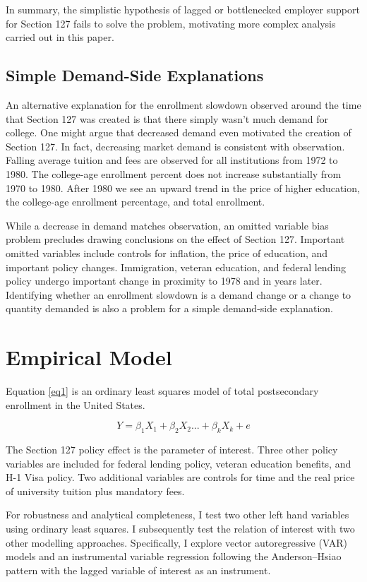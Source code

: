 \documentclass[review]{elsarticle}
\begin{document}
In summary, the simplistic hypothesis of lagged or bottlenecked employer support for Section 127 fails to solve the problem,
motivating more complex analysis carried out in this paper.

\subsection{Simple Demand-Side Explanations}
An alternative explanation for the enrollment slowdown observed around the time that Section 127 was created is that there simply wasn't much demand for college.
One might argue that decreased demand even motivated the creation of Section 127.
In fact, decreasing market demand is consistent with observation.
Falling average tuition and fees are observed for all institutions from 1972 to 1980.
The college-age enrollment percent does not increase substantially from 1970 to 1980.
After 1980 we see an upward trend in the price of higher education, the college-age enrollment percentage, and total enrollment.

While a decrease in demand matches observation,
an omitted variable bias problem precludes drawing conclusions on the effect of Section 127.
Important omitted variables include controls for inflation, the price of education, and important policy changes.
Immigration, veteran education, and federal lending policy undergo important change in proximity to 1978 and in years later.
Identifying whether an enrollment slowdown is a demand change or a change to quantity demanded is also a problem for a simple demand-side explanation.

\section{Empirical Model}

Equation \ref{eq1} is an ordinary least squares model of total postsecondary enrollment in the United States.

\begin{equation}
    Y = \beta_1X_1+\beta_2X_2...+\beta_kX_k+e
    \label{eq1}
\end{equation}

The Section 127 policy effect is the parameter of interest.
Three other policy variables are included for federal lending policy, veteran education benefits, and H-1 Visa policy.
Two additional variables are controls for time and the real price of university tuition plus mandatory fees.

For robustness and analytical completeness, I test two other left hand variables using ordinary least squares.
I subsequently test the relation of interest with two other modelling approaches.
Specifically, I explore vector autoregressive (VAR) models
and an instrumental variable regression following the Anderson–Hsiao pattern\cite{anderson1981estimation} with the lagged variable of interest as an instrument.
\end{document}
